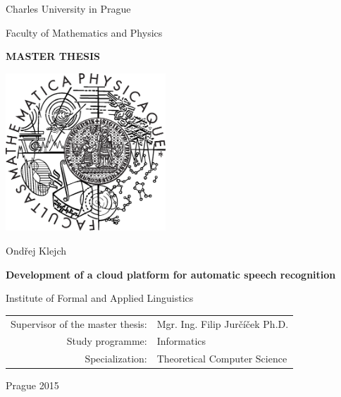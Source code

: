 \documentclass[12pt,a4paper]{report}
\begin{document}


\pagestyle{empty}
\begin{center}

\large

Charles University in Prague

\medskip

Faculty of Mathematics and Physics

\vfill

{\bf\Large MASTER THESIS}

\vfill

\centerline{\mbox{\includegraphics[width=60mm]{./img/logo.eps}}}

\vfill
\vspace{5mm}

{\LARGE Ondřej Klejch}

\vspace{15mm}

{\LARGE\bfseries Development of a cloud platform for automatic speech recognition}

\vfill

Institute of Formal and Applied Linguistics

\vfill

\begin{tabular}{rl}

Supervisor of the master thesis: & Mgr. Ing. Filip Jurčíček Ph.D. \\
\noalign{\vspace{2mm}}
Study programme: & Informatics \\
\noalign{\vspace{2mm}}
Specialization: & Theoretical Computer Science \\
\end{tabular}

\vfill

Prague 2015

\end{center}
\end{document}
